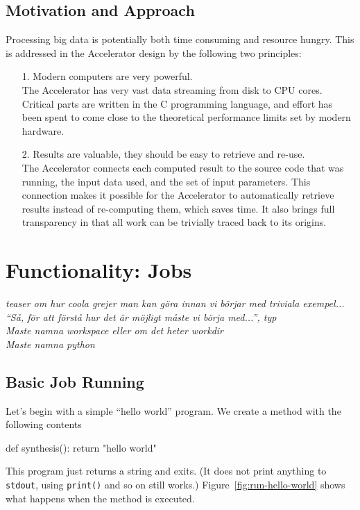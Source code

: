 \documentclass[a4paper]{article}
\begin{document}
\subsection*{Motivation and Approach}
Processing big data is potentially both time consuming and resource
hungry.  This is addressed in the Accelerator design by the following
two principles:
\begin{itemize}
\item[1.] Modern computers are very powerful.\\ The Accelerator has
  very vast data streaming from disk to CPU cores.  Critical parts are
  written in the C programming language, and effort has been spent to
  come close to the theoretical performance limits set by modern
  hardware.
  
\item[2.] Results are valuable, they should be easy to retrieve and
  re-use.\\ The Accelerator connects each computed result to the
  source code that was running, the input data used, and the set of
  input parameters.  This connection makes it possible for the
  Accelerator to automatically retrieve results instead of
  re-computing them, which saves time.  It also brings full
  transparency in that all work can be trivially traced back to its
  origins.
\end{itemize}

\clearpage
\section{Functionality: Jobs}

\emph{
 teaser om hur coola grejer man kan göra innan vi börjar med triviala
 exempel...  ``Så, för att förstå hur det är möjligt måste vi börja
 med...'', typ
}\\

\emph{Maste namna workspace eller om det heter workdir}\\

\emph{Maste namna python}\\




\subsection{Basic Job Running}

Let's begin with a simple ``hello world'' program.  We create a method
with the following contents
\begin{python}
def synthesis():
    return "hello world"
\end{python}
This program just returns a string and exits.  (It does not print
anything to \texttt{stdout}, using \texttt{print()} and so on still
works.)  Figure~\ref{fig:run-hello-world} shows what happens when the
method is executed.
\end{document}
